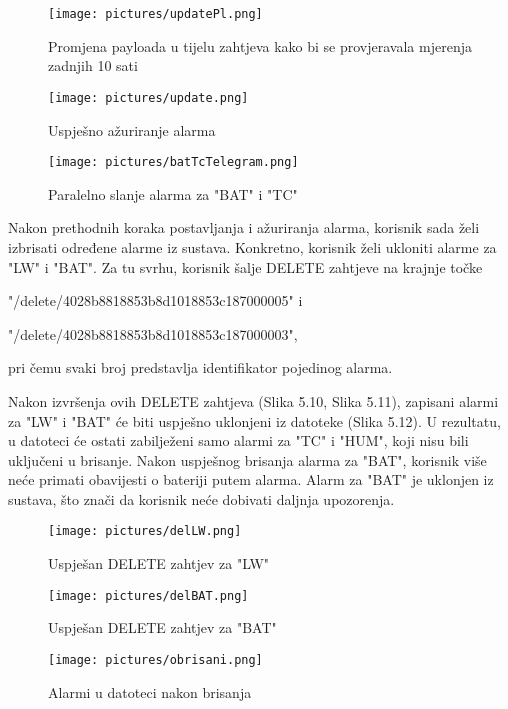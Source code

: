 \documentclass[times, utf8, zavrsni]{fer}
\begin{document}
 \begin{figure}[h!]
			\texttt{[image: pictures/updatePl.png]} %
		\centering
			\caption{Promjena payloada u tijelu zahtjeva kako bi se provjeravala mjerenja zadnjih 10 sati}
			\label{fig:promjene}
     \end{figure}
\begin{figure}[h!]
			\texttt{[image: pictures/update.png]} %
		\centering
			\caption{Uspješno ažuriranje alarma}
			\label{fig:promjene}
     \end{figure}
     \begin{figure}[h!]
			\texttt{[image: pictures/batTcTelegram.png]} %
		\centering
			\caption{Paralelno slanje alarma za "BAT" i "TC"}
			\label{fig:promjene}
     \end{figure}
     \newpage
Nakon prethodnih koraka postavljanja i ažuriranja alarma, korisnik sada želi izbrisati određene alarme iz sustava. Konkretno, korisnik želi ukloniti alarme za "LW" i "BAT". Za tu svrhu, korisnik šalje DELETE zahtjeve na krajnje točke 

"/delete/4028b8818853b8d1018853c187000005" i 

"/delete/4028b8818853b8d1018853c187000003",

pri čemu svaki broj predstavlja identifikator pojedinog alarma.

Nakon izvršenja ovih DELETE zahtjeva (Slika 5.10, Slika 5.11), zapisani alarmi za "LW" i "BAT" će biti uspješno uklonjeni iz datoteke (Slika 5.12). U rezultatu, u datoteci će ostati zabilježeni samo alarmi za "TC" i "HUM", koji nisu bili uključeni u brisanje. Nakon uspješnog brisanja alarma za "BAT", korisnik više neće primati obavijesti o bateriji putem alarma. Alarm za "BAT" je uklonjen iz sustava, što znači da korisnik neće dobivati daljnja upozorenja. 

\begin{figure}[h!]
			\texttt{[image: pictures/delLW.png]} %
		\centering
			\caption{Uspješan DELETE zahtjev za "LW"}
			\label{fig:promjene}
     \end{figure}
     \begin{figure}[h!]
			\texttt{[image: pictures/delBAT.png]} %
		\centering
			\caption{Uspješan DELETE zahtjev za "BAT"}
			\label{fig:promjene}
     \end{figure}
     \makeatletter
\setlength\@fptop{0pt} 
\setlength{} 
\setlength\@fpbot{0pt}
\makeatother
     \begin{figure}[t!]
			\texttt{[image: pictures/obrisani.png]} %
		\centering
			\caption{Alarmi u datoteci nakon brisanja}
			\label{fig:promjene}
     \end{figure}
     \newpage
\end{document}
